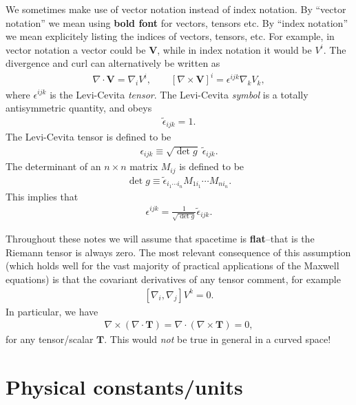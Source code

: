 \documentclass[12pt]{report}
\newcommand{\bT}{{\bm T}}
\newcommand{\bV}{{\bm V}}
\begin{document}
We sometimes make use of vector notation instead of index notation.
By ``vector notation'' we mean using \textbf{bold font} for vectors, tensors etc.
By ``index notation'' we mean explicitely listing the indices of vectors, tensors, etc.
For example, in vector notation a vector could be $\bV$, while in index notation it would be $V^i$.
The divergence and curl can alternatively be written as
\begin{align}
    \nabla\cdot\bV
    =
    \nabla_iV^i
    ,\qquad
    \left[\nabla\times \bV\right]^i
    =
    \epsilon^{ijk}\nabla_kV_k
    ,
\end{align}
where $\epsilon^{ijk}$ is the Levi-Cevita \emph{tensor}.
The Levi-Cevita \emph{symbol} is a totally antisymmetric quantity, and obeys
\begin{align}
    \tilde{\epsilon}_{ijk} = 1
    .
\end{align}
The Levi-Cevita tensor is defined to be
\begin{align}
    \epsilon_{ijk} \equiv \sqrt{\det g} \; \tilde{\epsilon}_{ijk}
    .
\end{align}
The determinant of an $n\times n$ matrix $M_{ij}$ is defined to be
\begin{align}
    \det g
    \equiv
    \tilde{\epsilon}_{i_1\cdots i_n}M_{1i_1}\cdots M_{ni_n}
    .
\end{align}
This implies that
\begin{align}
    \epsilon^{ijk}
    =
    \frac{1}{\sqrt{\det g}} \tilde{\epsilon}_{ijk}
    .
\end{align}

Throughout these notes we will assume that spacetime is \textbf{flat}--that is the Riemann tensor is always zero.
The most relevant consequence of this assumption (which holds well for the vast majority of practical applications of the Maxwell equations) is that the covariant derivatives of any tensor comment, for example
\begin{align}
    \left[\nabla_i,\nabla_j\right]V^k
    =
    0
    .
\end{align}
In particular, we have
\begin{align}
    \nabla\times\left(\nabla \cdot \bT\right) 
    =
    \nabla\cdot\left(\nabla \times \bT\right)
    =
    0
    ,
\end{align}
for any tensor/scalar $\bT$.
This would \emph{not} be true in general in a curved space! 

\chapter{Physical constants/units}
\end{document}
